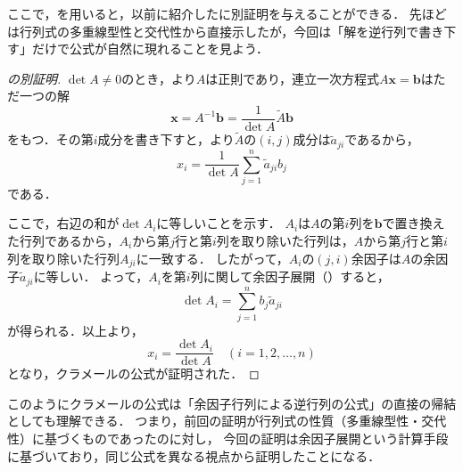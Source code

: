 ここで，を用いると，以前に紹介したに別証明を与えることができる．
先ほどは行列式の多重線型性と交代性から直接示したが，今回は「解を逆行列で書き下す」だけで公式が自然に現れることを見よう．

\begin{leftbar}
\begin{proof}[の別証明]
  $\det A \ne 0$のとき，より$A$は正則であり，連立一次方程式$A\bm{x} = \bm{b}$はただ一つの解
  \[
  \bm{x} = A^{-1}\bm{b} = \frac{1}{\det A}\tilde{A}\bm{b}
  \]
  をもつ．その第$i$成分を書き下すと，より$\tilde{A}$の$(i,j)$成分は$\tilde{a}_{ji}$であるから，
  \[
  x_i = \frac{1}{\det A}\sum_{j=1}^{n} \tilde{a}_{ji} b_j
  \]
  である．

  ここで，右辺の和が$\det A_i$に等しいことを示す．
  $A_i$は$A$の第$i$列を$\bm{b}$で置き換えた行列であるから，$A_i$から第$j$行と第$i$列を取り除いた行列は，$A$から第$j$行と第$i$列を取り除いた行列$A_{ji}$に一致する．
  したがって，$A_i$の$(j,i)$余因子は$A$の余因子$\tilde{a}_{ji}$に等しい．
  よって，$A_i$を第$i$列に関して余因子展開（）すると，
  \[
  \det A_i = \sum_{j=1}^{n} b_j \tilde{a}_{ji}
  \]
  が得られる．以上より，
  \[
  x_i = \frac{\det A_i}{\det A} \quad (i = 1, 2, \dots, n)
  \]
  となり，クラメールの公式が証明された．
\end{proof}
\end{leftbar}

このようにクラメールの公式は「余因子行列による逆行列の公式」の直接の帰結としても理解できる．
つまり，前回の証明が行列式の性質（多重線型性・交代性）に基づくものであったのに対し，
今回の証明は余因子展開という計算手段に基づいており，同じ公式を異なる視点から証明したことになる．